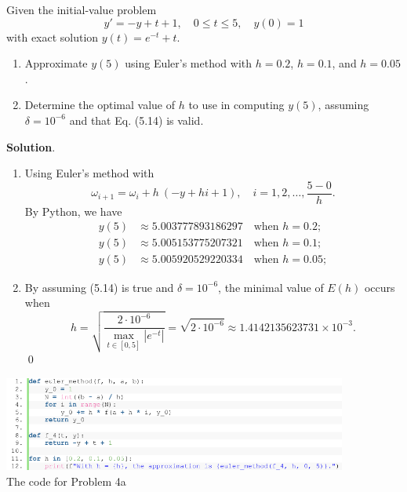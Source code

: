 \documentclass[11pt]{article}
\theoremstyle{break}
\numberwithin{equation}{theorem}
\begin{document}
\newpage
\begin{problem}\label{problem 4} %
    Given the initial-value problem $$y'=-y+t+1, \quad 0\leq t\leq 5, \quad y(0)=1$$ with exact solution $y(t)=e^{-t}+t$.
    \begin{enumerate}
        \item Approximate $y(5)$ using Euler's method with $h = 0.2$, $h = 0.1$, and $h = 0.05$.
        \item Determine the optimal value of $h$ to use in computing $y(5)$, assuming $\delta = 10^{-6}$ and that Eq. (5.14) is valid.
    \end{enumerate}
\end{problem}
\textbf{Solution}. 
\begin{enumerate}
    \item Using Euler's method with \begin{equation*}
        \omega_{i+1}=\omega_i+h\:(-y+hi+1), \quad i=1,2,\dots,\dfrac{5-0}{h}.
    \end{equation*}
    By Python, we have \begin{align*}
        y(5)&\approx5.003777893186297\quad\text{when $h=0.2$};\\
        y(5)&\approx5.005153775207321\quad\text{when $h=0.1$};\\
        y(5)&\approx5.005920529220334\quad\text{when $h=0.05$};
    \end{align*}
    \item By assuming (5.14) is true and $\delta=10^{-6}$, the minimal value of $E(h)$ occurs when $$h=\sqrt{\dfrac{2\cdot10^{-6}}{\max_{t\in[0, 5]}|e^{-t}|}}=\sqrt{2\cdot10^{-6}}\approx1.4142135623731\times10^{-3}.$$ \qed
\end{enumerate}

\begin{center}
    \includegraphics[width=0.85\textwidth]{P4.png}\\
    The code for Problem 4a
\end{center}
\end{document}
